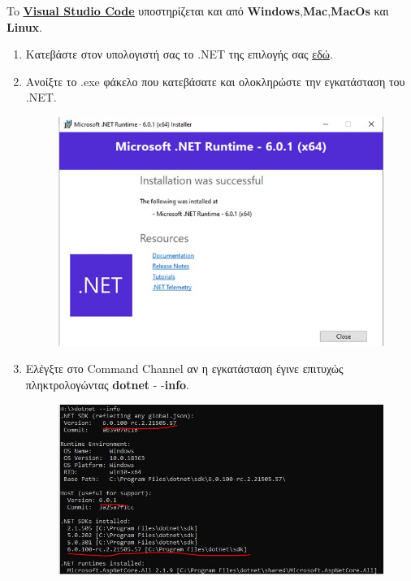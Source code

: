 \setlength{\parindent}{10mm}
To \href{https://code.visualstudio.com/Download}{\textbf{\uline{Visual Studio Code}}} υποστηρίζεται και από \textbf{Windows},\textbf{Mac},\textbf{MacOs} και \textbf{Linux}.

\begin{enumerate}
    \item Κατεβάστε στον υπολογιστή σας το .ΝΕΤ της επιλογής σας \href{https://dotnet.microsoft.com/en-us/download/visual-studio-sdks}{\uline{εδώ}}.

    \item Ανοίξτε το .exe φάκελο που κατεβάσατε και ολοκληρώστε την εγκατάσταση του .ΝΕΤ. 

    \begin{figure}[ht]
        \centering
        \includegraphics[scale=0.4]{images/instVSC1.jpg}
    \end{figure}

    \item Ελέγξτε στο Command Channel αν η εγκατάσταση έγινε επιτυχώς πληκτρολογώντας \textbf{dotnet} - -\textbf{info}.

    \begin{figure}[ht]
        \centering
        \includegraphics[scale=0.4]{images/instVSC2.jpeg}
    \end{figure}


\end{enumerate}
